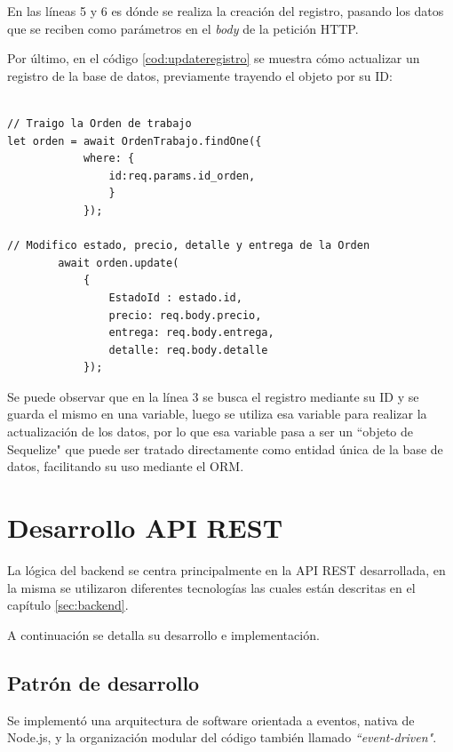 En las líneas 5 y 6 es dónde se realiza la creación del registro, pasando los datos que se reciben como parámetros en el \textit{body} de la petición HTTP.

Por último, en el código \ref{cod:updateregistro} se muestra cómo actualizar un registro de la base de datos, previamente trayendo el objeto por su ID:

\begin{lstlisting}[label=cod:updateregistro,caption=Código resumido para actualizar un registro en la base de datos.]

// Traigo la Orden de trabajo
let orden = await OrdenTrabajo.findOne({
            where: {
                id:req.params.id_orden,
                }
            });
            
// Modifico estado, precio, detalle y entrega de la Orden
        await orden.update(
            {
                EstadoId : estado.id,
                precio: req.body.precio,
                entrega: req.body.entrega,
                detalle: req.body.detalle
            });
\end{lstlisting}

Se puede observar que en la línea 3 se busca el registro mediante su ID y se guarda el mismo en una variable, luego se utiliza esa variable para realizar la actualización de los datos, por lo que esa variable pasa a ser un ``objeto de Sequelize" que puede ser tratado directamente como entidad única de la base de datos, facilitando su uso mediante el ORM.


\section{Desarrollo API REST}
\label{sec:arquitecturaapirest}

La lógica del backend se centra principalmente en la API REST desarrollada, en la misma se utilizaron diferentes tecnologías las cuales están descritas en el capítulo \ref{sec:backend}.

A continuación se detalla su desarrollo e implementación.

\subsection{Patrón de desarrollo}
\label{subsec:apipatron}

Se implementó una arquitectura de software orientada a eventos, nativa de Node.js, y la organización modular del código también llamado \textit{``event-driven"}.

